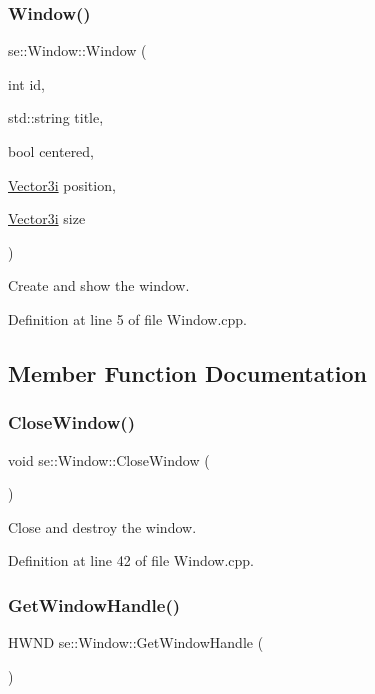 \subsubsection{\texorpdfstring{Window()}{Window()}}
{\footnotesize\ttfamily se\+::\+Window\+::\+Window (\begin{DoxyParamCaption}\item[{int}]{id,  }\item[{std\+::string}]{title,  }\item[{bool}]{centered,  }\item[{\mbox{\hyperlink{namespacese_ada11715de7cf6e87b5dfb4611fe68d29}{Vector3i}}}]{position,  }\item[{\mbox{\hyperlink{namespacese_ada11715de7cf6e87b5dfb4611fe68d29}{Vector3i}}}]{size }\end{DoxyParamCaption})}

Create and show the window. 

Definition at line 5 of file Window.\+cpp.



\subsection{Member Function Documentation}
\mbox{\label{classse_1_1_window_a5d405fd0707124c8df9d4a628d7a33c7}} 
\subsubsection{\texorpdfstring{Close\+Window()}{CloseWindow()}}
{\footnotesize\ttfamily void se\+::\+Window\+::\+Close\+Window (\begin{DoxyParamCaption}{ }\end{DoxyParamCaption})}

Close and destroy the window. 

Definition at line 42 of file Window.\+cpp.

\mbox{\label{classse_1_1_window_afa8b06b9831c41d9a38e375bfb133c9e}} 
\subsubsection{\texorpdfstring{Get\+Window\+Handle()}{GetWindowHandle()}}
{\footnotesize\ttfamily H\+W\+ND se\+::\+Window\+::\+Get\+Window\+Handle (\begin{DoxyParamCaption}{ }\end{DoxyParamCaption})}

